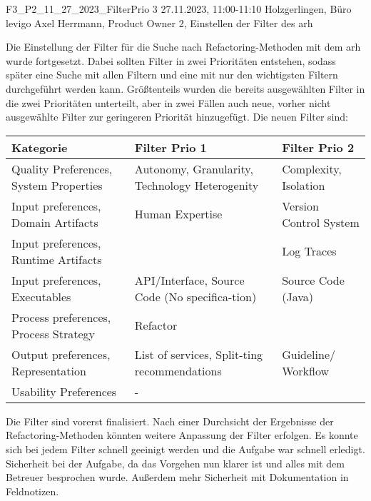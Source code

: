 \fieldnote
{F3\_P2\_11\_27\_2023\_FilterPrio}
{3}
{27.11.2023, 11:00-11:10}
{Holzgerlingen, Büro levigo}
{Axel Herrmann, Product Owner}
{2, Einstellen der Filter des \gls{arh}}
{
	Die Einstellung der Filter für die Suche nach Refactoring-Methoden mit dem \gls{arh} wurde fortgesetzt.
	Dabei sollten Filter in zwei Prioritäten entstehen, sodass später eine Suche mit allen Filtern und eine mit nur den wichtigsten Filtern durchgeführt werden kann.
	Größtenteils wurden die bereits ausgewählten Filter in die zwei Prioritäten unterteilt, aber in zwei Fällen auch neue, vorher nicht ausgewählte Filter zur geringeren Priorität hinzugefügt.
	Die neuen Filter sind:
	\begin{tabular}{|p{3cm}|p{3.5cm}|p{3cm}|}
		\hline
		\textbf{Kategorie} & \textbf{Filter Prio 1} & \textbf{Filter Prio 2} \\ \hline
		Quality Preferences, System Properties & Autonomy, Granularity, Technology Heterogenity & Complexity, Isolation \\ \hline
		Input preferences, Domain Artifacts & Human Expertise & Version Control System \\ \hline
		Input preferences, Runtime Artifacts & & Log Traces \\ \hline
		Input preferences, Executables & API/Interface, Source Code (No specifica-tion) & Source Code (Java) \\ \hline
		Process preferences, Process Strategy & Refactor & \\ \hline
		Output preferences, Representation & List of services, Split-ting recommendations & Guideline/ Workflow \\ \hline
		Usability Preferences & - & \\ \hline
	\end{tabular}
}
{
	Die Filter sind vorerst finalisiert. Nach einer Durchsicht der Ergebnisse der Refactoring-Methoden könnten weitere Anpassung der Filter erfolgen.
}
{
	Es konnte sich bei jedem Filter schnell geeinigt werden und die Aufgabe war schnell erledigt.
}
{}
{
	Sicherheit bei der Aufgabe, da das Vorgehen nun klarer ist und alles mit dem Betreuer besprochen wurde.
	Außerdem mehr Sicherheit mit Dokumentation in Feldnotizen.
}

